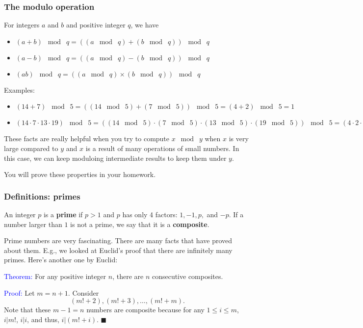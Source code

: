 \begin{frame}\frametitle{The modulo operation}
  \begin{tcolorbox}
    For integers $a$ and $b$ and positive integer $q$, we have
    \begin{itemize}
    \item $(a+b)\;\bmod\;q = ((a\;\bmod\;q) + (b\;\bmod\;q))\;\bmod\; q$
    \item $(a-b)\;\bmod\;q = ((a\;\bmod\;q) - (b\;\bmod\;q))\;\bmod\; q$
    \item $(ab)\;\bmod\;q = ((a\;\bmod\;q) \times (b\;\bmod\;q))\;\bmod\; q$
    \end{itemize}
  \end{tcolorbox}

  Examples:
  \begin{itemize}
    \item $(14 + 7)\;\bmod\; 5 = ((14\;\bmod\;5) + (7\;\bmod\;5))\;\bmod\;5 = (4+2)\;\bmod\;5 = 1$
    \item $(14\cdot 7\cdot 13\cdot 19)\;\bmod\; 5 = ((14\;\bmod\;5)\cdot(7\;\bmod\;5)\cdot(13\;\bmod\;5)\cdot(19\;\bmod\;5))\;\bmod\;5 = (4\cdot 2\cdot 3\cdot 4)\;\bmod\;5 = 96\;\bmod\;5=1$
  \end{itemize}

  {\small These facts are really helpful when you try to compute
    $x\;\bmod\; y$ when $x$ is very large compared to $y$ and $x$ is a
    result of many operations of small numbers.  In this case, we can
    keep moduloing intermediate results to keep them under $y$.
  
    You will prove these properties in your homework.
  }
\end{frame}

\begin{frame}\frametitle{Definitions: primes}
  \begin{tcolorbox}
    An integer $p$ is a {\bf prime} if $p>1$ and $p$ has only 4
    factors: $1,-1,p,$ and $-p$.  If a number larger than $1$ is not a
    prime, we say that it is a {\bf composite}.
  \end{tcolorbox}

  Prime numbers are very fascinating.  There are many facts that have
  proved about them.  E.g., we looked at Euclid's proof that there are
  infinitely many primes.  Here's another one by Euclid:

  {\small
    \begin{tcolorbox}
      \textcolor{blue}{Theorem:} For any positive integer $n$, there
      are $n$ consecutive composites.
      
      \textcolor{blue}{Proof:} Let $m=n+1$.  Consider
      \[
      (m!+2),(m!+3),\ldots,(m!+m).
      \]
      Note that these $m-1=n$ numbers are composite because for any
      $1\leq i\leq m$, $i|m!$, $i|i$, and thus,
      $i|(m!+i)$. $\blacksquare$
    \end{tcolorbox}
  }
\end{frame}

